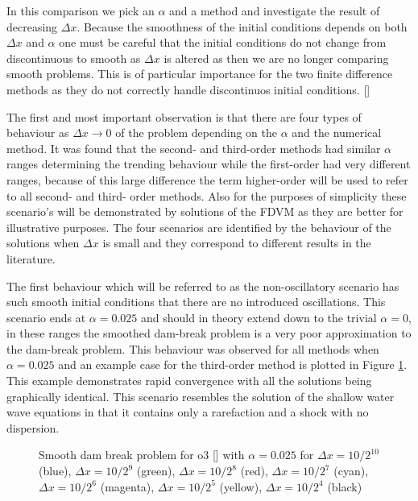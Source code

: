 \documentclass[SingleSpace,12pt,Proceedings]{Serre_ASCE}
\begin{document}
In this comparison we pick an $\alpha$ and a method and investigate the result of decreasing $\Delta x$. Because the smoothness of the initial conditions depends on both $\Delta x$ and $\alpha$ one must be careful that the initial conditions do not change from discontinuous to smooth as $\Delta x$ is altered as then we are no longer comparing smooth problems. This is of particular importance for the two finite difference methods as they do not correctly handle discontinuos initial conditions. [] 

The first and most important observation is that there are four types of behaviour as $\Delta x \rightarrow 0$ of the problem depending on the $\alpha$ and the numerical method. It was found that the second- and third-order methods had similar $\alpha$ ranges determining the trending behaviour while the first-order had very different ranges, because of this large difference the term higher-order will be used to refer to all second- and third- order methods. Also for the purposes of simplicity these scenario's will be demonstrated by solutions of the FDVM as they are better for illustrative purposes. The four scenarios are identified by the behaviour of the solutions when $\Delta x$ is small and they correspond to different results in the literature. 

The first behaviour which will be referred to as the non-oscillatory scenario has such smooth initial conditions that there are no introduced oscillations. This scenario ends at $\alpha = 0.025$ and should in theory extend down to the trivial $\alpha = 0$, in these ranges the smoothed dam-break problem is a very poor approximation to the dam-break problem. This behaviour was observed for all methods when $\alpha = 0.025$ and an example case for the third-order method is plotted in Figure \ref{fig:o3a1dxlimflatexp}. This example demonstrates rapid convergence with all the solutions being graphically identical. This scenario resembles the solution of the shallow water wave equations in that it contains only a rarefaction and a shock with no dispersion. 

\begin{figure}
\centering
{}
\caption{Smooth dam break problem for o3 [] with $\alpha = 0.025$ for $\Delta x = 10/2^{10}$ (blue), $\Delta x = 10/2^9$ (green), $\Delta x = 10/2^8$ (red), $\Delta x = 10/2^7$ (cyan), $\Delta x = 10/2^6$ (magenta), $\Delta x = 10/2^5$ (yellow), $\Delta x = 10/2^4$ (black)}
\label{fig:o3a1dxlimflatexp}
\end{figure}
\end{document}
